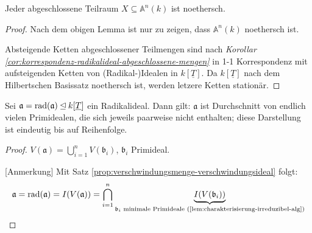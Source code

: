 \begin{prop}
  \label{prop:algebraische-mengen-noethersch}
  Jeder abgeschlossene Teilraum $X\subseteq\mathbb{A}^{n}(k)$ ist noethersch.
\end{prop}
\begin{proof}
  Nach dem obigen Lemma ist nur zu zeigen, dass $\mathbb{A}^{n}(k)$
  noethersch ist.

  Absteigende Ketten abgeschlossener Teilmengen sind nach \emph{Korollar
    \ref{cor:korrespondenz-radikalideal-abgeschlossene-mengen}} in 1-1 Korrespondenz mit aufsteigenden Ketten von (Radikal-)Idealen
  in $k[\underline{T}]$. Da $k[\underline{T}]$ nach dem Hilbertschen
  Basissatz noethersch ist, werden letzere Ketten stationär.
\end{proof}
\begin{cor}[Primärzerlegung]
  \label{cor:primaerzerlegung}
  Sei $\mathfrak{a}=\operatorname{rad}(\mathfrak{a})\unlhd k[\underline{T}]$
  ein Radikalideal. Dann gilt: $\mathfrak{a}$ ist Durchschnitt von
  endlich vielen Primidealen, die sich jeweils paarweise nicht enthalten; diese
  Darstellung ist eindeutig bis auf Reihenfolge.
\end{cor}
\begin{proof}
  $V(\mathfrak{a})=\bigcup_{i=1}^{n}V(\mathfrak{b}_{i})$, $\mathfrak{b}_{i}$
  Primideal.%
  \begin{comment}
    Stationäre Kette folgt aus noethersch (Satz 21); mit Bemerkung 16
    bzw. Lemma 17 folgt, dass die $\mathfrak{b}_{i}$ Primideale sind.
  \end{comment}
  {} [Anmerkung] Mit Satz \ref{prop:verschwindungsmenge-verschwindungsideal} folgt: %
  \[
    \mathfrak{a}=\operatorname{rad}(\mathfrak{a})=I(V(\mathfrak{a}))=\bigcap_{i=1}^{n}\underbrace{I(V(\mathfrak{b}_{i}))}_{\mathfrak{b}_{i}\text{ minimale Primideale (\ref{lem:charakterisierung-irreduzibel-alg})}}
  \]
\end{proof}

